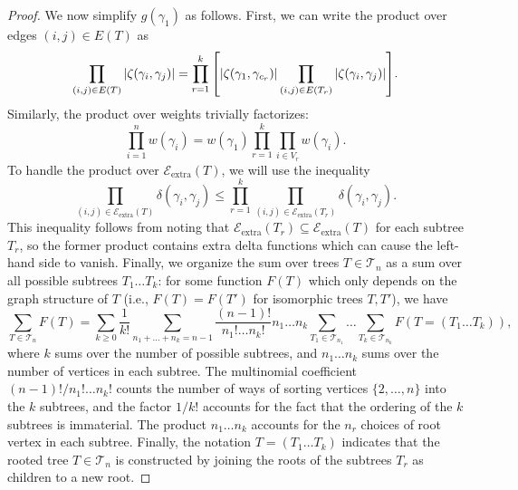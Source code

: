 \begin{proof}
    We now simplify $g(\gamma_1)$ as follows. First, we can write the product over edges $(i, j) \in E(T)$ as
    \begin{equation}
        \prod_{(i, j) \in E(T)} \abs{\zeta(\gamma_i, \gamma_j)} = \prod_{r = 1}^k \qty[ \abs{\zeta(\gamma_{1}, \gamma_{c_r})} \prod_{(i, j) \in E(T_r)} \abs{\zeta(\gamma_i, \gamma_j)} ] .
    \end{equation}
    Similarly, the product over weights trivially factorizes:
    \begin{equation}
        \prod_{i = 1}^n w(\gamma_i) = w(\gamma_1) \prod_{r = 1}^k \prod_{i \in V_r} w(\gamma_i) .
    \end{equation}
    To handle the product over $\mathcal{E}_{\text{extra}}(T)$, we will use the inequality
    \begin{equation}
        \prod_{(i, j) \in \mathcal{E}_{\text{extra}}(T)} \delta(\gamma_i, \gamma_j) \leq \prod_{r = 1}^k \prod_{(i, j) \in \mathcal{E}_{\text{extra}}(T_r)} \delta(\gamma_i, \gamma_j) .
    \end{equation}
    This inequality follows from noting that $\mathcal{E}_{\text{extra}}(T_r) \subseteq \mathcal{E}_{\text{extra}}(T)$ for each subtree $T_r$, so the former product contains extra delta functions which can cause the left-hand side to vanish. Finally, we organize the sum over trees $T \in \mathcal{T}_n$ as a sum over all possible subtrees $T_1 \ldots T_k$: for some function $F(T)$ which only depends on the graph structure of $T$ (i.e., $F(T) = F(T')$ for isomorphic trees $T, T'$), we have
    \begin{equation}
        \sum_{T \in \mathcal{T}_n} F(T) = \sum_{k \geq 0} \frac{1}{k!} \sum_{n_1 + \ldots + n_k = n-1} \frac{(n-1)!}{n_1! \ldots n_k!} n_1 \ldots n_k \sum_{T_1 \in \mathcal{T}_{n_1}} \ldots \sum_{T_k \in \mathcal{T}_{n_k}} F(T = (T_1 \ldots T_k)) ,
    \end{equation}
    where $k$ sums over the number of possible subtrees, and $n_1 \ldots n_k$ sums over the number of vertices in each subtree. The multinomial coefficient $(n-1)! / n_1! \ldots n_k!$ counts the number of ways of sorting vertices $\{2, \ldots , n\}$ into the $k$ subtrees, and the factor $1/k!$ accounts for the fact that the ordering of the $k$ subtrees is immaterial. The product $n_1 \ldots n_k$ accounts for the $n_r$ choices of root vertex in each subtree. Finally, the notation $T = (T_1 \ldots T_k)$ indicates that the rooted tree $T \in \mathcal{T}_n$ is constructed by joining the roots of the subtrees $T_r$ as children to a new root. 
    

\end{proof}
